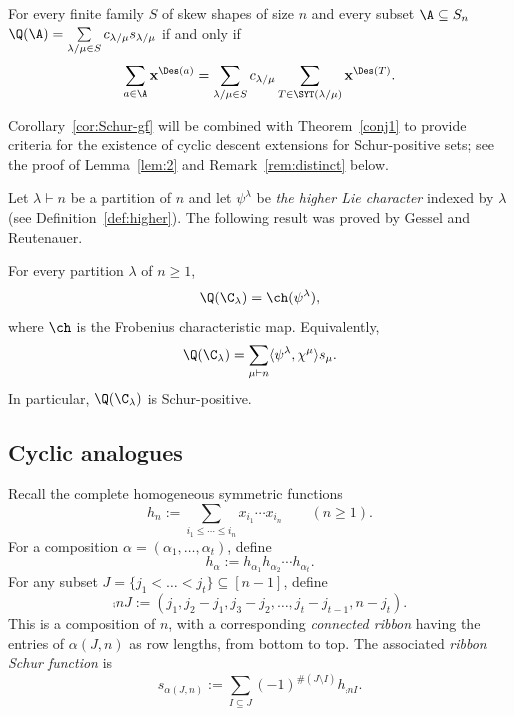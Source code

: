 \begin{corollary}\label{cor:Schur-gf}
    For every finite family $S$ of skew shapes of size $n$  and every subset $\A\subseteq S_n$ 
    $\Q(\A)= \sum\limits_{\lambda/\mu\in S} c_{\lambda/\mu} s_{\lambda/\mu}$ 
    if and only if 
    \[
        \sum\limits_{a\in \A} {\bf x}^{\Des(a)}=\sum\limits_{\lambda/\mu\in S} c_{\lambda/\mu} 
        \sum\limits_{T\in \SYT(\lambda/\mu)}{\bf x}^{\Des(T)}. 
    \]
\end{corollary}

Corollary~\ref{cor:Schur-gf} will be combined with Theorem~\ref{conj1} to provide criteria for the existence of cyclic descent extensions for Schur-positive sets; see the proof of Lemma~\ref{lem:2} and Remark~\ref{rem:distinct} below.  

Let $\lambda \vdash n$ be a partition of $n$ and let $\psi^\lambda$ be {\em the higher Lie character} indexed by $\lambda$ (see Definition~\ref{def:higher}).
The following result was proved by Gessel and Reutenauer. 

\begin{theorem}\label{thm:GR22}
	For every partition $\lambda$ of $n\ge 1$, 
	\[
		\Q(\C_\lambda) = \ch(\psi^\lambda),
	\]
	where $\ch$ is the Frobenius characteristic map.
    Equivalently,		
	\[
		\Q(\C_\lambda)=
		\sum\limits_{\mu \vdash n} 
		\langle \psi^\lambda, \chi^\mu  \rangle s_\mu.
	\]
	In particular, $\Q(\C_\lambda)$ is Schur-positive.
\end{theorem}


\subsection{Cyclic analogues}
\label{sec:prel2}
		
Recall the complete homogeneous symmetric functions
\[
    h_n := 
    \sum_{i_1\le \cdots\le i_n} x_{i_1} \cdots x_{i_n}
    \qquad (n \ge 1).
\]
For a composition $\alpha =(\alpha_1,\ldots,\alpha_t)$, define
\[
    h_\alpha :=
    h_{\alpha_1}h_{\alpha_2} \cdots h_{\alpha_t}. 
\]
For any subset $J=\{j_1  < \ldots < j_t\} \subseteq [n-1]$, define
\[
    \comp{n}{J} := 
    (j_1,j_2-j_1,j_3-j_2,\ldots,j_t-j_{t-1},n-j_t).
\]
This is a composition of $n$, with a corresponding {\em connected ribbon} having the entries of $\alpha(J,n)$ as row lengths, from bottom to top. 
The associated {\em ribbon Schur function} is
\[
    s_{\alpha(J,n)} :=
    \sum_{I \subseteq J} (-1)^{\#(J \setminus I)} h_{\comp{n}{I}}. 
\]

